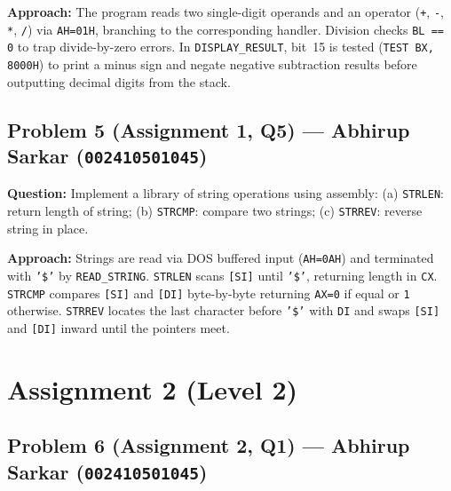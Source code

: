 \documentclass[11pt,a4paper]{article}
\begin{document}
\textbf{Approach:} The program reads two single-digit operands and an operator (\texttt{+}, \texttt{-}, \texttt{*}, \texttt{/}) via \texttt{AH=01H}, branching to the corresponding handler. Division checks \texttt{BL == 0} to trap divide-by-zero errors. In \texttt{DISPLAY\_RESULT}, bit~15 is tested (\texttt{TEST BX, 8000H}) to print a minus sign and negate negative subtraction results before outputting decimal digits from the stack.



\subsection{Problem 5 (Assignment 1, Q5) --- Abhirup Sarkar (\texttt{002410501045})}

\textbf{Question:} Implement a library of string operations using assembly: (a) \texttt{STRLEN}: return length of string; (b) \texttt{STRCMP}: compare two strings; (c) \texttt{STRREV}: reverse string in place.

\textbf{Approach:} Strings are read via DOS buffered input (\texttt{AH=0AH}) and terminated with \texttt{'\$'} by \texttt{READ\_STRING}. \texttt{STRLEN} scans \texttt{[SI]} until \texttt{'\$'}, returning length in \texttt{CX}. \texttt{STRCMP} compares \texttt{[SI]} and \texttt{[DI]} byte-by-byte returning \texttt{AX=0} if equal or \texttt{1} otherwise. \texttt{STRREV} locates the last character before \texttt{'\$'} with \texttt{DI} and swaps \texttt{[SI]} and \texttt{[DI]} inward until the pointers meet.



\section{Assignment 2 (Level 2)}

\subsection{Problem 6 (Assignment 2, Q1) --- Abhirup Sarkar (\texttt{002410501045})}
\end{document}
